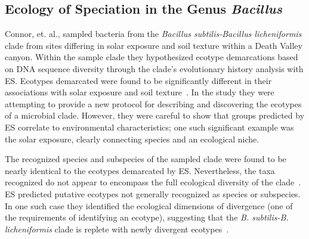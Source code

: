 \subsection*{Ecology of Speciation in the Genus \emph{Bacillus}}
Connor, et. al., sampled bacteria from the \emph{Bacillus subtilis-Bacillus licheniformis} clade from sites differing in solar exposure and soil texture within a Death Valley canyon.
Within the sample clade they hypothesized ecotype demarcations based on DNA sequence diversity through the clade's evolutionary history analysis with ES.
Ecotypes demarcated were found to be significantly different in their associations with solar exposure and soil texture~\cite{connor2010ecology}.
In the study they were attempting to provide a new protocol for describing and discovering the ecotypes of a microbial clade.
However, they were careful to show that groups predicted by ES correlate to environmental characteristics; one such significant example was the solar exposure, clearly connecting species and an ecological niche.

The recognized species and subspecies of the sampled clade were found to be nearly identical to the ecotypes demarcated by ES.
Nevertheless, the taxa recognized do not appear to encompass the full ecological diversity of the clade~\cite{connor2010ecology}.
ES predicted putative ecotypes not generally recognized as species or subspecies.
In one such case they identified the ecological dimensions of divergence (one of the requirements of identifying an ecotype), suggesting that the \emph{B. subtilis-B. licheniformis} clade is replete with newly divergent ecotypes~\cite{connor2010ecology}.

